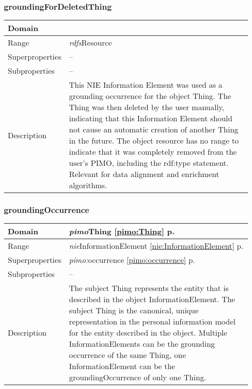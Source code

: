 \subsubsection{groundingForDeletedThing} 
\label{pimo:groundingForDeletedThing}
\begin{longtable}{|p{}|p{}|}
 \hline 
Domain & \\ \hline 
Range & {\it rdfs}\hspace{1pt}Resource\\ \hline 
Superproperties & --\\ \hline 
Subproperties & --\\ \hline 
Description & This NIE Information Element was used as a grounding occurrence for the object Thing. The Thing was then deleted by the user manually, indicating that this Information Element should not cause an automatic creation of another Thing in the future. The object resource has no range to indicate that it was completely removed from the user's PIMO, including the rdf:type statement. Relevant for data alignment and enrichment algorithms.\\ \hline 
\end{longtable}


\subsubsection{groundingOccurrence} 
\label{pimo:groundingOccurrence}
\begin{longtable}{|p{}|p{}|}
 \hline 
Domain & {\it pimo}\hspace{1pt}Thing \ref{pimo:Thing} p. \pageref{pimo:Thing}\\ \hline 
Range & {\it nie}\hspace{1pt}InformationElement \ref{nie:InformationElement} p. \pageref{nie:InformationElement}\\ \hline 
Superproperties & {\it pimo:}occurrence \ref{pimo:occurrence} p. \pageref{pimo:occurrence}\\ \hline 
Subproperties & --\\ \hline 
Description & The subject Thing represents the entity that is described in the object InformationElement. The subject Thing is the canonical, unique representation in the personal information model for the entity described in the object. Multiple InformationElements can be the grounding occurrence of the same Thing,  one InformationElement can be the groundingOccurrence of only one Thing.\\ \hline 
\end{longtable}


